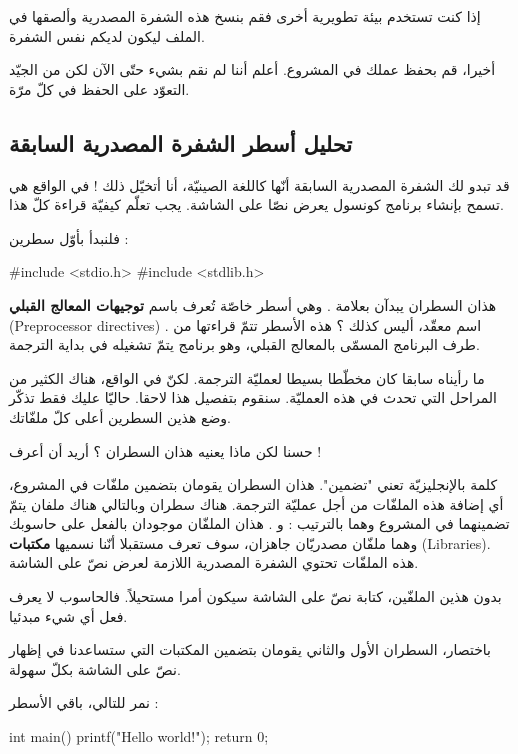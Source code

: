 إذا كنت تستخدم بيئة تطويرية أخرى فقم بنسخ هذه الشفرة المصدرية وألصقها في الملف  ليكون لديكم نفس الشفرة.

أخيرا، قم بحفظ عملك في المشروع. أعلم أننا لم نقم بشيء حتّى الآن لكن من الجيّد التعوّد على الحفظ في كلّ مرّة.

\subsection{تحليل أسطر الشفرة المصدرية السابقة}
قد تبدو لك الشفرة المصدرية السابقة أنّها كاللغة الصينيّة، أنا أتخيّل ذلك ! في الواقع هي تسمح بإنشاء برنامج كونسول يعرض نصّا على الشاشة. يجب تعلّم كيفيّة قراءة كلّ هذا.

فلنبدأ بأوّل سطرين :
\begin{Csource}
#include <stdio.h>
#include <stdlib.h>
\end{Csource}

هذان السطران يبدآن بعلامة
\InlineCode{\#}.
وهي أسطر خاصّة تُعرف باسم
\textbf{توجيهات المعالج القبلي}
(\textenglish{Preprocessor directives})
. اسم معقّد، أليس كذلك ؟ هذه الأسطر تتمّ قراءتها من طرف البرنامج المسمّى بالمعالج القبلي، وهو برنامج يتمّ تشغيله في بداية الترجمة.

ما رأيناه سابقا كان مخطّطا بسيطا لعمليّة الترجمة. لكنّ في الواقع، هناك الكثير من المراحل التي تحدث في هذه العمليّة. سنقوم بتفصيل هذا لاحقا. حاليّا عليك فقط تذكّر وضع هذين السطرين أعلى كلّ ملفّاتك.

\begin{question}
  حسنا لكن ماذا يعنيه هذان السطران ؟ أريد أن أعرف !
\end{question}

كلمة
 بالإنجليزيّة تعني "تضمين". هذان السطران يقومان بتضمين ملفّات في المشروع، أي إضافة هذه الملفّات من أجل عمليّة الترجمة. هناك سطران وبالتالي هناك ملفان يتمّ تضمينهما في المشروع وهما بالترتيب :
 و
.
هذان الملفّان موجودان بالفعل على حاسوبك وهما ملفّان مصدريّان جاهزان، سوف تعرف مستقبلا أنّنا نسميها
\textbf{مكتبات}
(\textenglish{Libraries}).
 هذه الملفّات تحتوي الشفرة المصدرية اللازمة لعرض نصّ على الشاشة.

 بدون هذين الملفّين، كتابة نصّ على الشاشة سيكون أمرا مستحيلاً. فالحاسوب لا يعرف فعل أي شيء مبدئيا.

 باختصار، السطران الأول والثاني يقومان بتضمين المكتبات التي ستساعدنا في إظهار نصّ على الشاشة بكلّ سهولة.

 نمر للتالي، باقي الأسطر :
 
\begin{Csource}
int main()
{
    printf("Hello world!\n");
    return 0;
}
\end{Csource}

